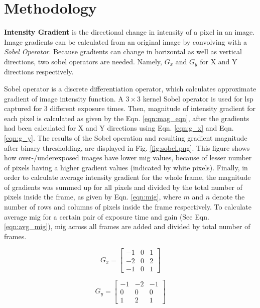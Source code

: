 \chapter{Methodology}\label{chap:methodology}    
    \vspace{5mm}
    \textbf{Intensity Gradient} is the directional change in intensity of a pixel in an image. Image gradients can be calculated from an original image by convolving with a \emph{Sobel Operator}. Because gradients can change in horizontal as well as vertical directions, two sobel operators are needed. Namely, $G_x$ and $G_y$ for X and Y directions respectively.

    \vspace{5mm}
    \noindent Sobel operator is a discrete differentiation operator, which calculates approximate gradient of image intensity function. A $3\times3$ kernel Sobel operator is used for \gls{lsp} captured for 3 different exposure times. Then, magnitude of intensity gradient for each pixel is calculated as given by the Eqn. \ref{eqn:mag_eqn}, after the gradients had been calculated for X and Y directions using Eqn. \ref{eqn:g_x} and Eqn. \ref{eqn:g_y}. The results of the Sobel operation and resulting gradient magnitude after binary thresholding, are displayed in Fig. \ref{fig:sobel.png}. This figure shows how over-/underexposed images have lower \gls{mig} values, because of lesser number of pixels having a higher gradient values (indicated by white pixels). Finally, in order to calculate average intensity gradient for the whole frame, the magnitude of gradients was summed up for all pixels and divided by the total number of pixels inside the frame, as given by Eqn. \ref{eqn:mig}, where $m$ and $n$ denote the number of rows and columns of pixels inside the frame respectively. To calculate average \gls{mig} for a certain pair of exposure time and gain (See Eqn. \ref{eqn:avg_mig}), \gls{mig} across all frames are added and divided by total number of frames. 

    \begin{equation}
        G_x = 
        \begin{bmatrix}
            -1 & 0 & 1 \\
            -2 & 0 & 2 \\
            -1 & 0 & 1 
        \end{bmatrix}
        \label{eqn:g_x}
    \end{equation}

    \begin{equation}
        G_y = 
        \begin{bmatrix}
            -1 & -2 & -1 \\
            0 & 0 & 0 \\
            1 & 2 & 1 
        \end{bmatrix}
        \label{eqn:g_y}
    \end{equation}

